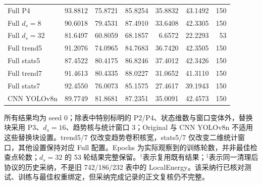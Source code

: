 \documentclass[journal]{IEEEtran}
\begin{document}
\begin{table}[!t]
\begin{tabular*}{\textwidth}{@{\extracolsep{\fill}}lrrrrrr}
Full P4
& 93.8812 & 75.8721 & 85.8254 & 35.8832 & 43.1492 & 150 \\
Full $d_s=8$
& 90.6018 & 79.4531 & 87.4910 & 33.6408 & 42.3305 & 150 \\
Full $d_s=32$
& 81.6497 & 60.8059 & 68.1857 & 6.6572 & 22.2293 & 53 \\
Full trend5
& 91.2076 & 74.0965 & 84.7683 & 36.7420 & 42.3505 & 150 \\
Full stats5
& 87.4522 & 80.4175 & 86.8246 & 37.4012 & 42.3426 & 150 \\
Full trend7
& 91.4613 & 80.4335 & 88.0227 & 31.0652 & 41.3110 & 150 \\
Full stats7
& 92.4550 & 76.0073 & 85.1575 & 27.4617 & 39.1943 & 150 \\
CNN YOLOv8n
& 89.7749 & 81.8681 & 87.2351 & 35.0091 & 42.4573 & 150 \\
\bottomrule
\end{tabular*}
\smallskip
\begin{minipage}{\linewidth}
\footnotesize
所有结果均为 seed 0；除表中特别标明的 P2/P4、状态维数与窗口变体外，替换块采用 P3、$d_s=16$、趋势核与统计窗口 3；Original 与 CNN YOLOv8n 不适用这些替换块设置。trend5/7 仅改变趋势卷积核宽，stats5/7 仅改变二维统计窗口，其他设置保持对应 Full 配置。Epochs 为实际观察到的训练轮数，并非最佳检查点轮数；$d_s=32$ 的 53 轮结果完整保留。$^{\dagger}$表示复用既有结果；$^{\ddagger}$表示同一清理后协议的历史采纳，不是旧 742/186/232 表中的 LocalEnergy。该采纳行已核对测试、训练与最佳权重绑定，但采纳完成记录的正文复核仍不完整。
\end{minipage}
\end{table}
\end{document}
